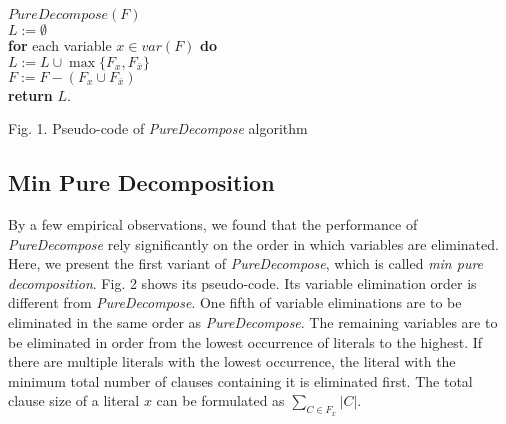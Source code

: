 \documentclass{llncs}
\begin{document}
\begin{flushleft}
\begin{sf}
\begin{footnotesize}
\hskip 12mm $PureDecompose (F)$\\
\hskip 16mm $ L := \emptyset $\\
\hskip 16mm {\bf for } each variable $ x \in var(F) $ {\bf do}\\
\hskip 20mm    $L := L \cup \max\{ F_x, F_{\bar x} \}$\\
\hskip 20mm    $F := F - (F_x \cup F_{\bar x})$\\
\hskip 16mm  {\bf return} $L$.

\vspace{1em}

\hskip 8mm \textrm{Fig. 1. Pseudo-code of \emph{PureDecompose}
algorithm}
\end{footnotesize}
\end{sf}
\end{flushleft}


\subsection{Min Pure Decomposition}

   By a few empirical observations, we found that the performance of \emph{PureDecompose} rely significantly
on the order in which variables are eliminated. Here, we present the
first variant of \emph{PureDecompose},  which is called \emph{min
pure decomposition}. Fig. 2 shows its pseudo-code.  Its variable
elimination order is different from \emph{PureDecompose}. One fifth
of variable eliminations are to be eliminated in the same order as
\emph{PureDecompose}. The remaining variables are to be eliminated
in order from the lowest occurrence of literals to the highest. If
there are multiple literals  with the lowest occurrence, the literal
with the minimum total number of clauses containing it is eliminated
first. The total clause size of a literal $x$ can be formulated as
$\sum_{C \in F_x} |C|$.
\end{document}
